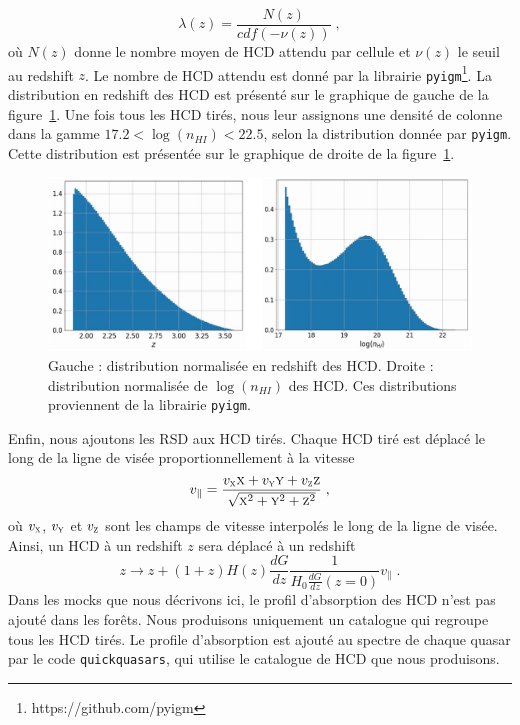\documentclass[11pt, twoside, a4paper, openright]{report}
\begin{document}
\begin{equation}
  \lambda(z) = \frac{N(z)}{cdf(-\nu(z))} \; ,
\end{equation}
où $N(z)$ donne le nombre moyen de HCD attendu par cellule et $\nu(z)$ le seuil au redshift $z$. Le nombre de HCD attendu est donné par la librairie \texttt{pyigm}\footnote{https://github.com/pyigm}. La distribution en redshift des HCD est présenté sur le graphique de gauche de la figure~\ref{fig:distrib_dla}. Une fois tous les HCD tirés, nous leur assignons une densité de colonne dans la gamme $\num{17.2} < \log(n_{HI}) < \num{22.5}$, selon la distribution donnée par \texttt{pyigm}. Cette distribution est présentée sur le graphique de droite de la figure~\ref{fig:distrib_dla}.
\begin{figure}
  \centering
  \includegraphics[scale=0.38]{distrib_dla}
  \caption{Gauche : distribution normalisée en redshift des HCD. Droite : distribution normalisée de $\log(n_{HI})$ des HCD. Ces distributions proviennent de la librairie \texttt{pyigm}.}
  \label{fig:distrib_dla}
\end{figure}
Enfin, nous ajoutons les RSD aux HCD tirés. Chaque HCD tiré est déplacé le long de la ligne de visée proportionnellement à la vitesse
\begin{equation}
v_{\parallel} = \frac{v_{\textsc{x}} \textsc{x} + v_{\textsc{y}} \textsc{y} + v_{\textsc{z}} \textsc{z}}{\sqrt{\textsc{x}^2 + \textsc{y}^2 + \textsc{z}^2}} \; ,
\end{equation}
où $v_{\textsc{x}}$, $v_{\textsc{y}}$ et $v_{\textsc{z}}$ sont les champs de vitesse interpolés le long de la ligne de visée. Ainsi, un HCD à un redshift $z$ sera déplacé à un redshift
\begin{equation}
   z \rightarrow  z + (1+z) H(z) \frac{dG}{dz} \frac{1}{H_0 \frac{dG}{dz}(z=0)} v_{\parallel} \; .
\end{equation}
Dans les mocks que nous décrivons ici, le profil d'absorption des HCD n'est pas ajouté dans les forêts. Nous produisons uniquement un catalogue qui regroupe tous les HCD tirés. Le profile d'absorption est ajouté au spectre de chaque quasar par le code \texttt{quickquasars}, qui utilise le catalogue de HCD que nous produisons.
\end{document}
